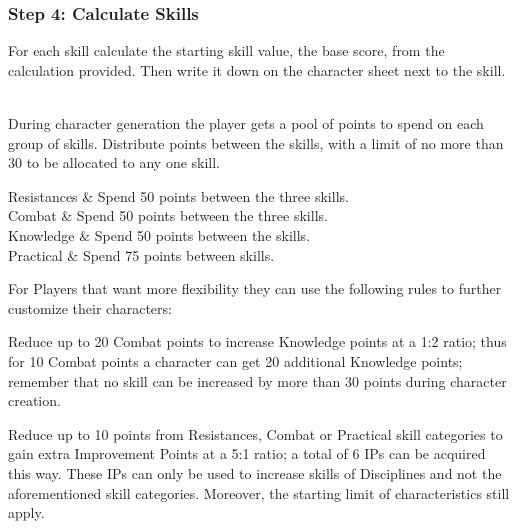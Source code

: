 

\subsubsection{Step 4: Calculate Skills}
For each skill calculate the starting skill value, the base score, from the calculation provided. Then write it down on the character sheet next to the skill.  

During character generation the player gets a pool of points to spend on each group of skills. Distribute points between the skills, with a limit of no more than 30 to be allocated to any one skill.

\begin{rpg-table}[|l|X|]
	\hline
	Resistances   & Spend 50 points between the three skills.\\
	Combat        & Spend 50 points between the three skills.\\
	Knowledge     & Spend 50 points between the skills.\\
	Practical     & Spend 75 points between skills.\\
	\hline
\end{rpg-table}

For Players that want more flexibility they can use the following rules to further customize their characters:
\begin{rpg-list}
\item Reduce up to 20 Combat points to increase Knowledge points at a 1:2 ratio; thus for 10 Combat points a character can get 20 additional Knowledge points; remember that no skill can be increased by more than 30 points during character creation.
\item Reduce up to 10 points from Resistances, Combat or Practical skill categories to gain extra Improvement Points at a 5:1 ratio; a total of 6 IPs can be acquired this way. These IPs can only be used to increase skills of Disciplines and not the aforementioned skill categories. Moreover, the starting limit of characteristics still apply.
\end{rpg-list}

